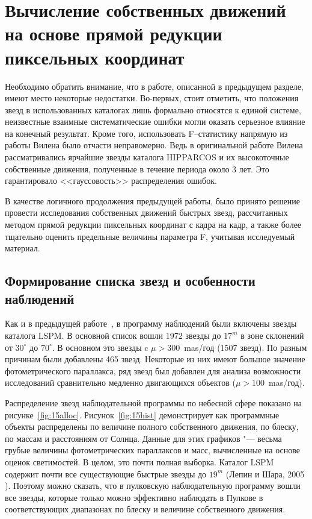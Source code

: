 \section{Вычисление собственных движений на основе прямой редукции пиксельных координат} \label{sec:ch3/sect2}
Необходимо обратить внимание, что в работе, описанной в предыдущем разделе, имеют место некоторые недостатки. Во-первых, стоит отметить, что положения звезд в использованных каталогах лишь формально относятся к единой системе, неизвестные взаимные систематические ошибки могли оказать серьезное влияние на конечный результат. Кроме того, использовать F--статистику напрямую из работы Вилена было отчасти неправомерно. Ведь в оригинальной работе Вилена рассматривались ярчайшие звезды каталога HIPPARCOS и их высокоточные собственные движения, полученные в течение периода около 3 лет. Это гарантировало <<гауссовость>>  распределения ошибок.

В качестве логичного продолжения предыдущей работы, было принято решение провести исследования собственных движений быстрых звезд, рассчитанных методом прямой редукции пиксельных координат с кадра на кадр, а также более тщательно оценить предельные величины параметра F, учитывая исследуемый материал.
\subsection{Формирование списка звезд и особенности наблюдений} \label{subsec:ch3/sect2/sub1}
Как и в предыдущей работе~\cite{2011AstL...37..420K}, в программу наблюдений были включены звезды каталога LSPM. В основной список вошли 1972 звезды до $17^m$ в зоне склонений от $30^{\circ}$ до $70^{\circ}$. В основном это звезды c $\mu>300$~mas/год (1507 звезд). По разным причинам были добавлены 465 звезд. Некоторые из них имеют большое значение фотометрического параллакса, ряд звезд был добавлен для анализа возможности исследований сравнительно медленно двигающихся объектов ($\mu>100$~mas/год).

Распределение звезд наблюдательной программы по небесной сфере показано на рисунке~\ref{fig:15alloc}. Рисунок~\ref{fig:15hist} демонстрирует как программные объекты распределены по величине полного собственного движения, по блеску, по массам и расстояниям от Солнца. Данные для этих графиков "--- весьма грубые величины фотометрических параллаксов и масс, вычисленные на основе оценок светимостей. В целом, это почти полная выборка. Каталог LSPM содержит почти все существующие быстрые звезды до $19^m$ (Лепин и Шара, 2005 ). Поэтому можно сказать, что в пулковскую наблюдательную программу вошли все звезды, которые только можно эффективно наблюдать в Пулкове в соответствующих диапазонах по блеску и величине собственного движения.

